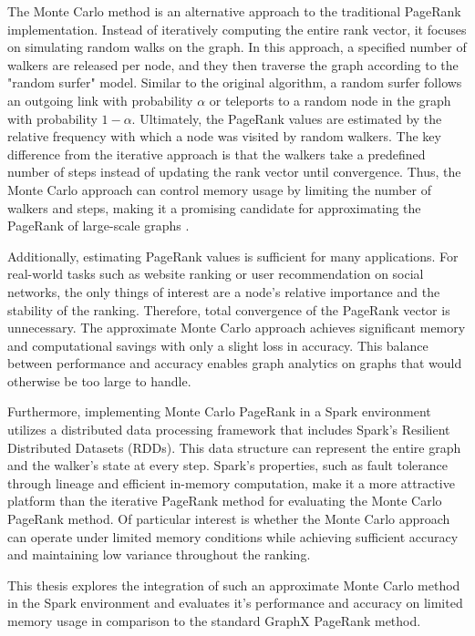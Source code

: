 The Monte Carlo method is an alternative approach to the traditional PageRank implementation. Instead of iteratively computing the entire rank vector, it focuses on simulating random walks on the graph. In this approach, a specified number of walkers are released per node, and they then traverse the graph according to the "random surfer" model. Similar to the original algorithm, a random surfer follows an outgoing link with probability $\alpha$ or teleports to a random node in the graph with probability $1-\alpha$. Ultimately, the PageRank values are estimated by the relative frequency with which a node was visited by random walkers. The key difference from the iterative approach is that the walkers take a predefined number of steps instead of updating the rank vector until convergence. Thus, the Monte Carlo approach can control memory usage by limiting the number of walkers and steps, making it a promising candidate for approximating the PageRank of large-scale graphs \cite{avrachenkov_monte_2007}. \par
Additionally, estimating PageRank values is sufficient for many applications. For real-world tasks such as website ranking or user recommendation on social networks, the only things of interest are a node's relative importance and the stability of the ranking. Therefore, total convergence of the PageRank vector is unnecessary. The approximate Monte Carlo approach achieves significant memory and computational savings with only a slight loss in accuracy. This balance between performance and accuracy enables graph analytics on graphs that would otherwise be too large to handle.\par
Furthermore, implementing Monte Carlo PageRank in a Spark environment utilizes a distributed data processing framework that includes Spark's Resilient Distributed \allowbreak Datasets (RDDs). This data structure can represent the entire graph and the walker's state at every step. Spark's properties, such as fault tolerance through lineage and efficient in-memory computation, make it a more attractive platform than the iterative PageRank method for evaluating the Monte Carlo PageRank method. Of particular interest is whether the Monte Carlo approach can operate under limited memory conditions while achieving sufficient accuracy and maintaining low variance throughout the ranking. \par
This thesis explores the integration of such an approximate Monte Carlo method in the Spark environment and evaluates it's performance and accuracy on limited memory usage in comparison to the standard GraphX PageRank method.
 

